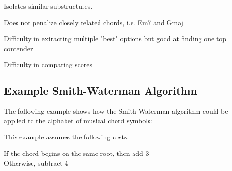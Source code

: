 \item Isolates similar substructures.

\item Does not penalize closely related chords, i.e. Em7 and Gmaj

\item Difficulty in extracting multiple "best" options but good at finding one top contender

\item Difficulty in comparing scores

\subsection{Example Smith-Waterman Algorithm}

The following example shows how the Smith-Waterman algorithm could be applied to the alphabet of musical chord symbols:

This example assumes the following costs:

If the chord begins on the same root, then add 3 \\
Otherwise, subtract 4 \\